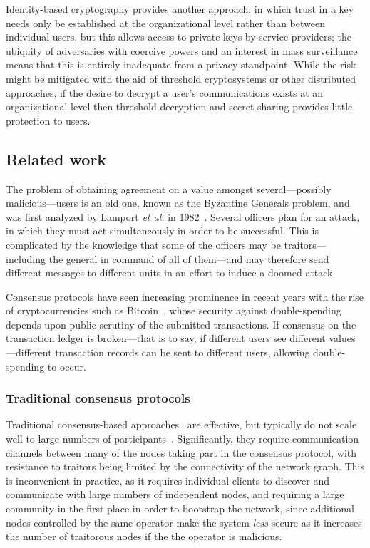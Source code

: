 \documentclass[USenglish]{llncs}
\begin{document}
Identity-based cryptography provides another approach, in which
trust in a key needs only be established at the organizational level rather than
between individual users, but this allows access to private keys by service providers;
the ubiquity of adversaries with coercive powers and an interest in mass surveillance
means that this is entirely inadequate from a privacy standpoint.  While the risk might be
mitigated with the aid of threshold cryptosystems or other distributed
approaches, if the desire to decrypt a user's communications exists at an
organizational level then threshold decryption and secret sharing provides
little protection to users.

\subsection{Related work}

The problem of obtaining agreement on a value amongst several---possibly
malicious---users is
an old one, known as the Byzantine Generals problem, and was first analyzed
by Lamport \emph{et al.} in 1982~\cite{byzantine-generals}.  Several officers
plan for an attack, in which they must act simultaneously
in order to be successful.  This is complicated by the knowledge that some of
the officers may be traitors---including the general in command of all of
them---and may therefore send different messages to different units in an
effort to induce a doomed attack.

Consensus protocols have seen increasing prominence in recent years
with the rise of cryptocurrencies such
as Bitcoin~\cite{bitcoin}, whose security against double-spending depends
upon public scrutiny of the submitted transactions.  If consensus on the
transaction ledger is broken---that is to say, if different users see different
values---different transaction records can be sent to different
users, allowing double-spending to occur.

\subsubsection{Traditional consensus protocols}

Traditional consensus-based approaches~\cite{lynch-distributed-algorithms}
are effective, but typically do not scale well to large numbers of
participants~\cite{vukolic16}.  Significantly, they require communication channels
between many of the nodes taking part in the consensus protocol, with
resistance to traitors being limited by the connectivity of the network graph.
This is inconvenient in practice, as it requires individual clients to discover
and communicate with large numbers of independent nodes, and requiring
a large community in the first place in order to bootstrap the network, since
additional nodes controlled by the same operator make the system
\emph{less} secure as it increases the number of traitorous nodes if the
the operator is malicious.
\end{document}
